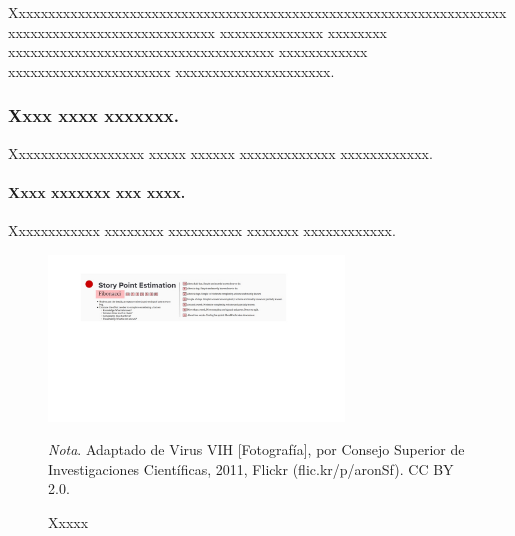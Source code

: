 Xxxxxxxxxxxxxxxxxxxxxxxxxxxxxxxxxxxxxxxxxxxxxxxxxxxxxxxxxxxxxxxxxxxxxxxxxxxxxxxxxxxxxxxxxxxxxxx xxxxxxxxxxxxxx xxxxxxxx xxxxxxxxxxxxxxxxxxxxxxxxxxxxxxxxxxxx xxxxxxxxxxxx xxxxxxxxxxxxxxxxxxxxxx xxxxxxxxxxxxxxxxxxxxx.

\subsubsection{Xxxx xxxx xxxxxxx.} Xxxxxxxxxxxxxxxxxx xxxxx xxxxxx xxxxxxxxxxxxx xxxxxxxxxxxx.

\paragraph{Xxxx xxxxxxx xxx xxxx.} Xxxxxxxxxxxx xxxxxxxx xxxxxxxxxx xxxxxxx xxxxxxxxxxxx.

\begin{figure}[H]
\centering
\includegraphics[width=0.7\textwidth]{figures/example.jpg}
\caption{Xxxxx}
\label{fig:figura1}
\textit{Nota}. Adaptado de Virus VIH [Fotografía], por Consejo Superior de Investigaciones Científicas, 2011, Flickr (flic.kr/p/aronSf). CC BY 2.0.
\end{figure}